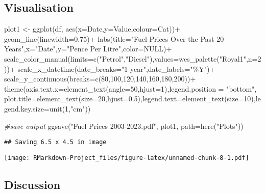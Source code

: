 \documentclass[
]{article}
\newenvironment{Shaded}{\begin{snugshade}}{\end{snugshade}}
\newcommand{\AttributeTok}[1]{\textcolor[rgb]{0.77,0.63,0.00}{#1}}
\newcommand{\CommentTok}[1]{\textcolor[rgb]{0.56,0.35,0.01}{\textit{#1}}}
\newcommand{\ConstantTok}[1]{\textcolor[rgb]{0.00,0.00,0.00}{#1}}
\newcommand{\DecValTok}[1]{\textcolor[rgb]{0.00,0.00,0.81}{#1}}
\newcommand{\FloatTok}[1]{\textcolor[rgb]{0.00,0.00,0.81}{#1}}
\newcommand{\FunctionTok}[1]{\textcolor[rgb]{0.00,0.00,0.00}{#1}}
\newcommand{\NormalTok}[1]{#1}
\newcommand{\OtherTok}[1]{\textcolor[rgb]{0.56,0.35,0.01}{#1}}
\newcommand{\SpecialCharTok}[1]{\textcolor[rgb]{0.00,0.00,0.00}{#1}}
\newcommand{\StringTok}[1]{\textcolor[rgb]{0.31,0.60,0.02}{#1}}
\begin{document}
\hypertarget{visualisation}{%
\subsection{Visualisation}\label{visualisation}}

\begin{Shaded}
\begin{Highlighting}[]
\NormalTok{plot1 }\OtherTok{\textless{}{-}} \FunctionTok{ggplot}\NormalTok{(df, }\FunctionTok{aes}\NormalTok{(}\AttributeTok{x=}\NormalTok{Date,}\AttributeTok{y=}\NormalTok{Value,}\AttributeTok{colour=}\NormalTok{Cat))}\SpecialCharTok{+}
  \FunctionTok{geom\_line}\NormalTok{(}\AttributeTok{linewidth=}\FloatTok{0.75}\NormalTok{)}\SpecialCharTok{+} 
  \FunctionTok{labs}\NormalTok{(}\AttributeTok{title=}\StringTok{"Fuel Prices Over the Past 20 Years"}\NormalTok{,}\AttributeTok{x=}\StringTok{"Date"}\NormalTok{,}\AttributeTok{y=}\StringTok{"Pence Per Litre"}\NormalTok{,}\AttributeTok{color=}\ConstantTok{NULL}\NormalTok{)}\SpecialCharTok{+}
  \FunctionTok{scale\_color\_manual}\NormalTok{(}\AttributeTok{limits=}\FunctionTok{c}\NormalTok{(}\StringTok{"Petrol"}\NormalTok{,}\StringTok{"Diesel"}\NormalTok{),}\AttributeTok{values=}\FunctionTok{wes\_palette}\NormalTok{(}\StringTok{"Royal1"}\NormalTok{,}\AttributeTok{n=}\DecValTok{2}\NormalTok{))}\SpecialCharTok{+}
  \FunctionTok{scale\_x\_datetime}\NormalTok{(}\AttributeTok{date\_breaks=}\StringTok{"1 year"}\NormalTok{,}\AttributeTok{date\_labels=}\StringTok{"\%Y"}\NormalTok{)}\SpecialCharTok{+}
  \FunctionTok{scale\_y\_continuous}\NormalTok{(}\AttributeTok{breaks=}\FunctionTok{c}\NormalTok{(}\DecValTok{80}\NormalTok{,}\DecValTok{100}\NormalTok{,}\DecValTok{120}\NormalTok{,}\DecValTok{140}\NormalTok{,}\DecValTok{160}\NormalTok{,}\DecValTok{180}\NormalTok{,}\DecValTok{200}\NormalTok{))}\SpecialCharTok{+}
  \FunctionTok{theme}\NormalTok{(}\AttributeTok{axis.text.x=}\FunctionTok{element\_text}\NormalTok{(}\AttributeTok{angle=}\DecValTok{50}\NormalTok{,}\AttributeTok{hjust=}\DecValTok{1}\NormalTok{),}\AttributeTok{legend.position =} \StringTok{"bottom"}\NormalTok{, }\AttributeTok{plot.title=}\FunctionTok{element\_text}\NormalTok{(}\AttributeTok{size=}\DecValTok{20}\NormalTok{,}\AttributeTok{hjust=}\FloatTok{0.5}\NormalTok{),}\AttributeTok{legend.text=}\FunctionTok{element\_text}\NormalTok{(}\AttributeTok{size=}\DecValTok{10}\NormalTok{),}\AttributeTok{legend.key.size=}\FunctionTok{unit}\NormalTok{(}\DecValTok{1}\NormalTok{,}\StringTok{"cm"}\NormalTok{))}


\CommentTok{\#save output}
\FunctionTok{ggsave}\NormalTok{(}\StringTok{"Fuel Prices 2003{-}2023.pdf"}\NormalTok{, plot1, }\AttributeTok{path=}\FunctionTok{here}\NormalTok{(}\StringTok{"Plots"}\NormalTok{)) }
\end{Highlighting}
\end{Shaded}

\begin{verbatim}
## Saving 6.5 x 4.5 in image
\end{verbatim}

\texttt{[image: RMarkdown-Project\_files/figure-latex/unnamed-chunk-8-1.pdf]}

\hypertarget{discussion}{%
\subsection{Discussion}\label{discussion}}
\end{document}
